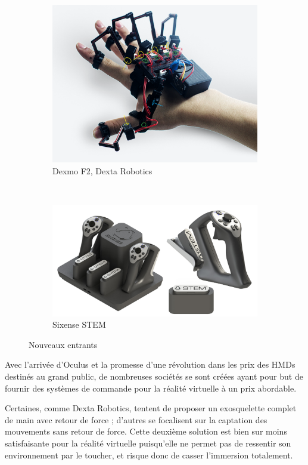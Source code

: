 \documentclass[a4,12pt]{scrartcl}
\begin{document}
\begin{figure}[!h]
	\centering
	\begin{subfigure}{.4\linewidth}
		\includegraphics[width=0.8\linewidth]{dexmo}
		\caption{Dexmo F2, Dexta Robotics}
	\end{subfigure}
	~
	\begin{subfigure}{.4\linewidth}
		\centering
		\includegraphics[width=\linewidth]{stem}
		\caption{Sixense STEM}
	\end{subfigure}
 	\caption{Nouveaux entrants}
 	\label{binaural}
\end{figure}


Avec l'arrivée d'Oculus et la promesse d'une révolution dans les prix des HMDs destinés au grand public, de nombreuses sociétés se sont créées ayant pour but de fournir des systèmes de commande pour la réalité virtuelle à un prix abordable.

Certaines, comme Dexta Robotics, tentent de proposer un exosquelette complet de main avec retour de force ; d'autres se focalisent sur la captation des mouvements sans retour de force. Cette deuxième solution est bien sur moins satisfaisante pour la réalité virtuelle puisqu'elle ne permet pas de ressentir son environnement par le toucher, et risque donc de casser l'immersion totalement. 
\end{document}
